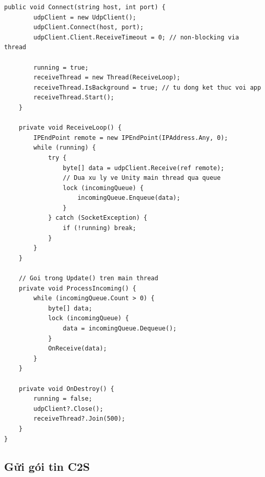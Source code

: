 \documentclass[12pt,a4paper]{report}
\begin{document}
\begin{lstlisting}[style=bashStyle, caption={ScreenManager --- ẩn/hiện Panel theo state}, label={lst:screenmgr}]
    public void Connect(string host, int port) {
        udpClient = new UdpClient();
        udpClient.Connect(host, port);
        udpClient.Client.ReceiveTimeout = 0; // non-blocking via thread

        running = true;
        receiveThread = new Thread(ReceiveLoop);
        receiveThread.IsBackground = true; // tu dong ket thuc voi app
        receiveThread.Start();
    }

    private void ReceiveLoop() {
        IPEndPoint remote = new IPEndPoint(IPAddress.Any, 0);
        while (running) {
            try {
                byte[] data = udpClient.Receive(ref remote);
                // Dua xu ly ve Unity main thread qua queue
                lock (incomingQueue) {
                    incomingQueue.Enqueue(data);
                }
            } catch (SocketException) {
                if (!running) break;
            }
        }
    }

    // Goi trong Update() tren main thread
    private void ProcessIncoming() {
        while (incomingQueue.Count > 0) {
            byte[] data;
            lock (incomingQueue) {
                data = incomingQueue.Dequeue();
            }
            OnReceive(data);
        }
    }

    private void OnDestroy() {
        running = false;
        udpClient?.Close();
        receiveThread?.Join(500);
    }
}
\end{lstlisting}

\subsection{Gửi gói tin C2S}
\end{document}
